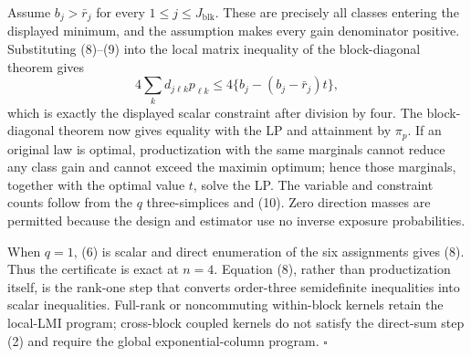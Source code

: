 Assume \(b_j>\bar r_j\) for every \(1\le j\le J_{\mathrm{blk}}\).  These are precisely all classes entering the displayed minimum, and the assumption makes every gain denominator positive.  Substituting (8)--(9) into the local matrix inequality of the block-diagonal theorem gives
\[
4\sum_kd_{j\ell k}p_{\ell k}
\le4\{b_j-(b_j-\bar r_j)t\},
\tag{10}
\]
which is exactly the displayed scalar constraint after division by four.  The block-diagonal theorem now gives equality with the LP and attainment by \(\pi_p\).  If an original law is optimal, productization with the same marginals cannot reduce any class gain and cannot exceed the maximin optimum; hence those marginals, together with the optimal value \(t\), solve the LP.  The variable and constraint counts follow from the \(q\) three-simplices and (10).  Zero direction masses are permitted because the design and estimator use no inverse exposure probabilities.

When \(q=1\), (6) is scalar and direct enumeration of the six assignments gives (8).  Thus the certificate is exact at \(n=4\).  Equation (8), rather than productization itself, is the rank-one step that converts order-three semidefinite inequalities into scalar inequalities.  Full-rank or noncommuting within-block kernels retain the local-LMI program; cross-block coupled kernels do not satisfy the direct-sum step (2) and require the global exponential-column program.  \(\square\)